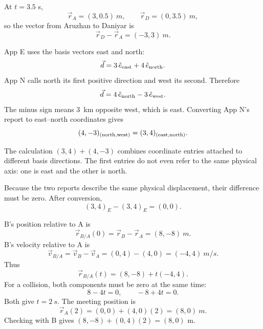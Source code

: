 \documentclass[11pt,a4paper]{article}
\begin{document}
At $t=3.5$ s,
\[
\vec r_A=(3,0.5)\ \si{m},\qquad \vec r_D=(0,3.5)\ \si{m},
\]
so the vector from Aruzhan to Daniyar is
\[
\vec r_D-\vec r_A=\boxed{(-3,3)\ \si{m}}.
\]


\clearpage
{}

App E uses the basis vectors east and north:
\[
\vec d=3\,\hat e_{\rm east}+4\,\hat e_{\rm north}.
\]
App N calls north its first positive direction and west its second. Therefore
\[
\vec d=4\,\hat e_{\rm north}-3\,\hat e_{\rm west}.
\]
The minus sign means \SI{3}{km} opposite west, which is east. Converting App N's report to east--north coordinates gives
\[
(4,-3)_{(\rm north,west)}=(3,4)_{(\rm east,north)}.
\]

The calculation $(3,4)+(4,-3)$ combines coordinate entries attached to different basis directions. The first entries do not even refer to the same physical axis: one is east and the other is north.

Because the two reports describe the same physical displacement, their difference must be zero. After conversion,
\[
(3,4)_{E}-(3,4)_{E}=\boxed{(0,0)}.
\]



\vfill

\clearpage
{}

B's position relative to A is
\[
\vec r_{B/A}(0)=\vec r_B-\vec r_A=(8,-8)\ \si{m}.
\]
B's velocity relative to A is
\[
\vec v_{B/A}=\vec v_B-\vec v_A=(0,4)-(4,0)=(-4,4)\ \si{m/s}.
\]
Thus
\[
\vec r_{B/A}(t)=(8,-8)+t(-4,4).
\]
For a collision, both components must be zero at the same time:
\[
8-4t=0,\qquad -8+4t=0.
\]
Both give $t=\SI{2}{s}$. The meeting position is
\[
\vec r_A(2)=(0,0)+(4,0)(2)=\boxed{(8,0)\ \si{m}}.
\]
Checking with B gives $(8,-8)+(0,4)(2)=(8,0)$ m.

\begin{center}
\end{center}


\end{document}
